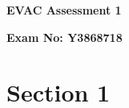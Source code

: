 \documentclass[12pt]{article}
\begin{document}
\begin{titlepage}
\begin{center}
\vspace*{1cm}
\Huge
\textbf{EVAC Assessment 1}
\vspace{1.5cm}
\Large

\textbf{Exam No: Y3868718}
\vfill
\end{center}
\end{titlepage}
\section{Section 1}

\pagebreak
\printbibliography
\end{document}
